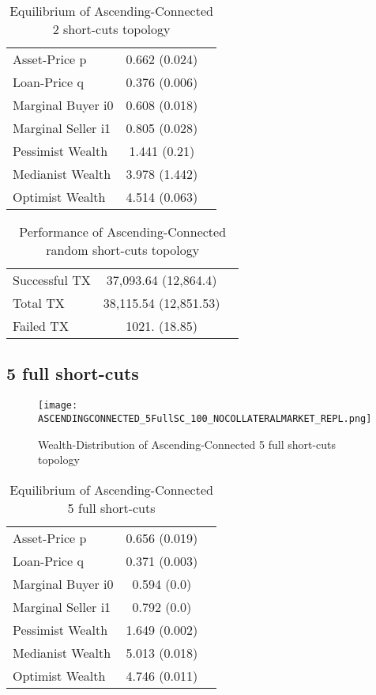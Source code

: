 \documentclass[Bachelorarbeit.tex]{subfiles}
\begin{document}
\begin{table}[h]
	\caption{Equilibrium of Ascending-Connected 2 short-cuts topology}
	\centering
	\begin{tabular} { l c r }
		\hline
		Asset-Price p & 0.662 (0.024) \\
		Loan-Price q & 0.376 (0.006) \\
		Marginal Buyer i0 & 0.608 (0.018) \\
		Marginal Seller i1 & 0.805 (0.028) \\
		\hline
		Pessimist Wealth & 1.441 (0.21) \\
		Medianist Wealth & 3.978 (1.442) \\
		Optimist Wealth & 4.514 (0.063) \\
		\hline
	\end{tabular}
\end{table} 

\begin{table}[h]
	\caption{Performance of Ascending-Connected random short-cuts topology}
	\centering
	\begin{tabular} { l c r }
		\hline
		Successful TX & 37,093.64 (12,864.4) \\
		Total TX & 38,115.54 (12,851.53) \\
		Failed TX & 1021. (18.85) \\
		\hline
	\end{tabular}
\end{table}

\subsection{5 full short-cuts}
\begin{figure}[H]
	\centering
  \texttt{[image: ASCENDINGCONNECTED\_5FullSC\_100\_NOCOLLATERALMARKET\_REPL.png]}
	\caption{Wealth-Distribution of Ascending-Connected 5 full short-cuts topology}
	\label{fig:wealth_ASCENDINGCONNECTED_5FullSC_100_NOCOLLATERALMARKET_REPL}
\end{figure}

\begin{table}[h]
	\caption{Equilibrium of Ascending-Connected 5 full short-cuts}
	\centering
	\begin{tabular} { l c r }
		\hline
		Asset-Price p & 0.656 (0.019) \\
		Loan-Price q & 0.371 (0.003) \\
		Marginal Buyer i0 & 0.594 (0.0) \\
		Marginal Seller i1 & 0.792 (0.0) \\
		\hline
		Pessimist Wealth & 1.649 (0.002) \\
		Medianist Wealth & 5.013 (0.018) \\
		Optimist Wealth & 4.746 (0.011) \\
		\hline
	\end{tabular}
\end{table} 
\end{document}
